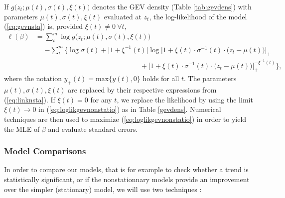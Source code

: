 If $g\big(z_t; \mu(t),\sigma(t),\xi(t)\big)$ denotes the GEV density (Table \ref{tab:gevdens}) with parameters $\mu(t),\sigma(t),\xi(t)$ evaluated at $z_t$, the log-likelihood of the model (\ref{eq:gevnsta}) is, provided $\xi(t)\neq0 \ \forall t$,
\begin{equation}\label{eq:loglikgevnonstatio}
\begin{aligned}
\ell(\beta)& = \sum_t^m\log g\big(z_t; \mu(t),\sigma(t),\xi(t)\big)\\ & = -\sum_t^m\Bigg\{ \log\sigma(t)+\big[1+\xi^{-1}(t)\big]\log\bigg[1+\xi(t)\cdot\sigma^{-1}(t)\cdot\Big(z_t-\mu(t)\Big)\bigg]_+ \\ & \qquad\qquad\qquad\qquad\qquad\qquad\qquad\quad +  \bigg[1+\xi(t)\cdot\sigma^{-1}(t)\cdot\Big(z_t-\mu(t)\Big)\bigg]_+^{-\xi^{-1}(t)} \Bigg\},
\end{aligned}
\end{equation}
where the notation  $y_+(t)=\text{max}\big\{y(t),0\big\}$ holds for all $t$. The parameters $\mu(t),\sigma(t),\xi(t)$ are replaced by their respective expressions from (\ref{eq:linknsta}). If $\xi(t)=0$ for any $t$, we replace the likelihood by using the limit $\xi(t)\to0$ in (\ref{eq:loglikgevnonstatio}) as in Table \ref{gevdens}. 
Numerical techniques are then used to maximize (\ref{eq:loglikgevnonstatio}) in order to yield the MLE of $\beta$ and evaluate standard errors.  



\subsubsection*{Model Comparisons}

In order to compare our models, that is for example to check whether a trend is statistically significant, or if the nonstationnary models provide an improvement over the simpler (stationary) model, we will use two techniques :

